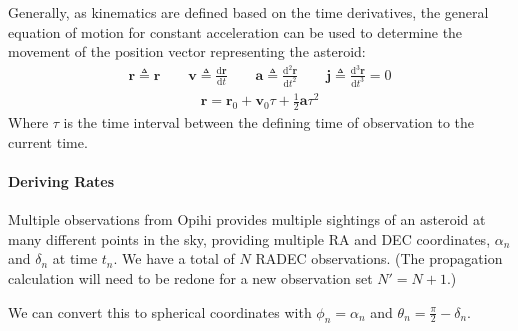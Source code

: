 \documentclass[letterpaper,11pt,english]{sphinxmanual}
\begin{document}
\sphinxAtStartPar
Generally, as kinematics are defined based on the time derivatives, the general
equation of motion for constant acceleration can be used to determine the
movement of the position vector representing the asteroid:
\begin{equation*}
\begin{split}\mathbf{r} \triangleq \mathbf{r} \qquad \mathbf{v} \triangleq \frac{\mathrm{d}\mathbf{r}}{\mathrm{d}t} \qquad \mathbf{a} \triangleq \frac{\mathrm{d}^2\mathbf{r}}{\mathrm{d}t^2} \qquad \mathbf{j} \triangleq \frac{\mathrm{d}^3\mathbf{r}}{\mathrm{d}t^3} = 0\end{split}
\end{equation*}\begin{equation*}
\begin{split}\mathbf{r} = \mathbf{r}_0 + \mathbf{v}_0 \tau + \frac{1}{2} \mathbf{a} \tau^2\end{split}
\end{equation*}
\sphinxAtStartPar
Where \(\tau\) is the time interval between the defining time of
observation to the current time.


\paragraph{Deriving Rates}
\label{\detokenize{technical/algorithms/spherical_kinematics:deriving-rates}}
\sphinxAtStartPar
Multiple observations from Opihi provides multiple sightings of an asteroid at
many different points in the sky, providing multiple RA and DEC coordinates,
\(\alpha_n\) and \(\delta_n\) at time \(t_n\). We have a total of
\(N\) RA\sphinxhyphen{}DEC observations. (The propagation calculation will need to be
redone for a new observation set \(N' = N + 1\).)

\sphinxAtStartPar
We can convert this to spherical coordinates with \(\phi_n = \alpha_n\)
and \(\theta_n = \frac{\pi}{2} - \delta_n\).
\end{document}
